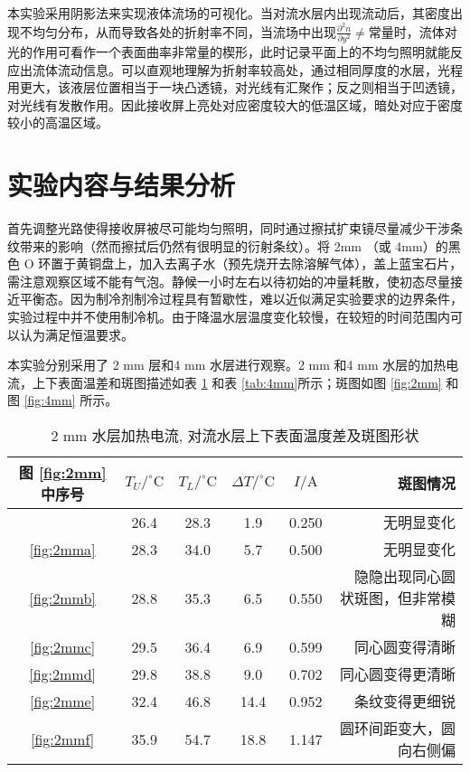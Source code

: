 \documentclass[aps,pre,12pt,preprint,onecolumn,showpacs,showkeys]{revtex4-1}
\def \degree {^\circ}
\begin{document}
	本实验采用阴影法来实现液体流场的可视化。当对流水层内出现流动后，其密度出现不均匀分布，从而导致各处的折射率不同，当流场中出现$\frac{\partial ^2 n}{\partial y^2}\ne $常量时，流体对光的作用可看作一个表面曲率非常量的楔形，此时记录平面上的不均匀照明就能反应出流体流动信息。可以直观地理解为折射率较高处，通过相同厚度的水层，光程用更大，该液层位置相当于一块凸透镜，对光线有汇聚作；反之则相当于凹透镜，对光线有发散作用。因此接收屏上亮处对应密度较大的低温区域，暗处对应于密度较小的高温区域。
	
\section{实验内容与结果分析}
	首先调整光路使得接收屏被尽可能均匀照明，同时通过擦拭扩束镜尽量减少干涉条纹带来的影响（然而擦拭后仍然有很明显的衍射条纹）。将 2mm （或 4mm）的黑色 O 环置于黄铜盘上，加入去离子水（预先烧开去除溶解气体），盖上蓝宝石片，需注意观察区域不能有气泡。静候一小时左右以待初始的冲量耗散，使初态尽量接近平衡态。因为制冷剂制冷过程具有暂歇性，难以近似满足实验要求的边界条件，实验过程中并不使用制冷机。由于降温水层温度变化较慢，在较短的时间范围内可以认为满足恒温要求。
	
	本实验分别采用了 2 mm 层和4 mm 水层进行观察。2 mm 和4 mm 水层的加热电流，上下表面温差和斑图描述如表 \ref{tab:2mm} 和表 \ref{tab:4mm}所示；斑图如图 \ref{fig:2mm} 和图 \ref{fig:4mm} 所示。
	\begin{table}[h]
		\caption{\label{tab:2mm}%
		2 mm 水层加热电流, 对流水层上下表面温度差及斑图形状}
		\begin{tabular}{cccccr}
			\hline
			图 \ref{fig:2mm} 中序号&$T_U/\degree \mathrm{C}$&$T_L/\degree \mathrm{C}$&$\Delta T/\degree \mathrm{C}$&$I/\mathrm{A}$&斑图情况\\\hline
			 & 26.4 & 28.3 & 1.9 & 0.250 & 无明显变化 \\
			\ref{fig:2mma} & 28.3 & 34.0 & 5.7 & 0.500 & 无明显变化 \\
			\ref{fig:2mmb} & 28.8 & 35.3 & 6.5 & 0.550 & $\quad$隐隐出现同心圆状斑图，但非常模糊 \\
			\ref{fig:2mmc} & 29.5 & 36.4 & 6.9 & 0.599 & 同心圆变得清晰\\
			\ref{fig:2mmd} & 29.8 & 38.8 & 9.0 & 0.702 & 同心圆变得更清晰\\
			\ref{fig:2mme} & 32.4 & 46.8 & 14.4 & 0.952 & 条纹变得更细锐\\
			\ref{fig:2mmf} & 35.9 & 54.7 & 18.8 & 1.147 & 圆环间距变大，圆向右侧偏 \\\hline
		\end{tabular}
	\end{table}
	
\end{document}
